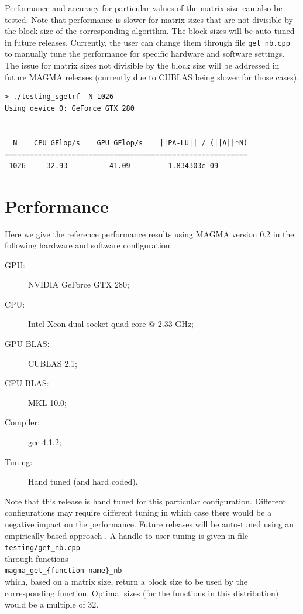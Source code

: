 \documentclass[10pt]{book}
\begin{document}
Performance and accuracy for particular values of the matrix
size can also be tested. Note that performance is slower
for matrix sizes that are not divisible by the block size of the 
corresponding algorithm. The block sizes will be auto-tuned
in future releases. Currently, the user can change them through
file {\tt get\_nb.cpp} to manually tune the performance for 
specific hardware and software settings. 
The issue for matrix sizes not divisible by the block size 
will be addressed in future MAGMA releases (currently due
to CUBLAS being slower for those cases).

\begin{verbatim}
> ./testing_sgetrf -N 1026
Using device 0: GeForce GTX 280


  N    CPU GFlop/s    GPU GFlop/s    ||PA-LU|| / (||A||*N)
==========================================================
 1026     32.93          41.09         1.834303e-09
\end{verbatim}

\chapter{Performance}\label{ch:performance}

Here we give the reference performance results using MAGMA version 0.2 
in the following hardware and software configuration:

\vspace{0.2in}
\begin{description}
\item[GPU:]  NVIDIA GeForce GTX 280;
\item[CPU:] Intel Xeon dual socket quad-core @ 2.33 GHz;
\item[GPU BLAS:] CUBLAS 2.1;
\item[CPU BLAS:] MKL 10.0;
\item[Compiler:] gcc 4.1.2;
\item[Tuning:] Hand tuned (and hard coded).
\end{description}

\vspace{0.2in}
Note that this release is hand tuned for this particular configuration.
Different configurations may require different tuning in which case
there would be a negative impact on the performance.
Future releases will be auto-tuned using an empirically-based 
approach \cite{lawn212}. A handle to user tuning is given in file \\
{\tt testing/get\_nb.cpp} \\
through functions \\
{\tt magma\_get\_\{function name\}\_nb}\\
which, based on a matrix
size, return a block size to be used by the corresponding function.
Optimal sizes (for the functions in this distribution) 
would be a multiple of 32.
\end{document}
